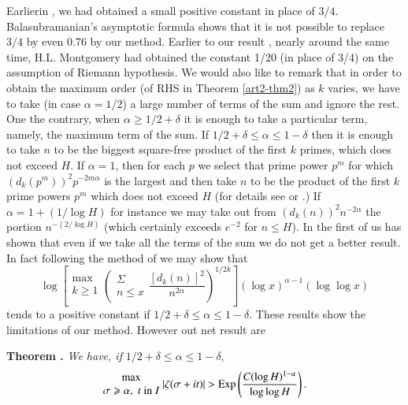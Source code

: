\begin{remark*}
Earlier\pageoriginale in \cite{art2-key2}, we had obtained a small positive constant in place of $3/4$. Balasubramanian's asymptotic formula shows that it is not possible to replace $3/4$ by even 0.76 by our method. Earlier to our result \cite{art2-key2}, nearly around the same time, H.L. Montgomery \cite{art2-key9} had obtained the constant 1/20 (in place of 3/4) on the assumption of Riemann hypothesis. We would also like to remark that in order to obtain the maximum order (of RHS in Theorem \ref{art2-thm2}) as $k$ varies, we have to take (in case $\alpha=1/2$) a large number of terms of the sum and ignore the rest. One the contrary, when $\alpha \geqslant 1/2 + \delta$ it is enough to take a particular term, namely, the maximum term of the sum. If $1/2+ \delta \leqslant \alpha \leqslant 1-\delta$ then it is enough to take $n$ to be the biggest square-free product of the first $k$ primes, which does not exceed $H$. If $\alpha =1$, then for each $p$ we select that prime power $p^m$ for which $(d_k (p^m))^2 p^{-2m\alpha}$ is the largest and then take $n$ to be the product of the first $k$ prime powers $p^m$ which does not exceed $H$  (for details see \cite{art2-key2} or \cite{art2-key17}.) If $\alpha =1+ (1/\log H)$ for instance we may take out from $(d_k(n))^2 n^{-2\alpha}$ the portion $n^{-(2/\log H)}$ (which certainly exceeds $e^{-2}$ for $n \leqslant H$). In \cite{art2-key2} the first of us has shown that even if we take all the terms of the sum we do not get a better result. In fact following the method of \cite{art2-key1} we may show that
$$
\log \left[\begin{matrix}
\max\\
k \geqslant 1
\end{matrix}
\left(
\begin{matrix}
\Sigma\\
n \leqslant x
\end{matrix}
\frac{[d_k(n)]^2}{n^{2\alpha}}
 \right)^{1/2k}
\right] (\log x)^{\alpha -1} (\log \log x)
$$
tends to a positive constant if $1/2 + \delta \leqslant \alpha \leqslant 1-\delta$. These results show the limitations of our method. However out net result are 
\end{remark*}
 
\noindent
{\bfseries Theorem .\label{art2-thm3A}} \textit{We have, if} $1/2 + \delta \leqslant \alpha \leqslant 1-\delta$,
$$
\begin{matrix}
\max\\
\sigma \geqslant \alpha, \; t \text{ in } I  
\end{matrix}\;
|\zeta (\sigma + it)| > \operatorname{Exp} 
\left(\frac{C(\log H)^{1-\alpha}}{\log \log H} \right).
$$

